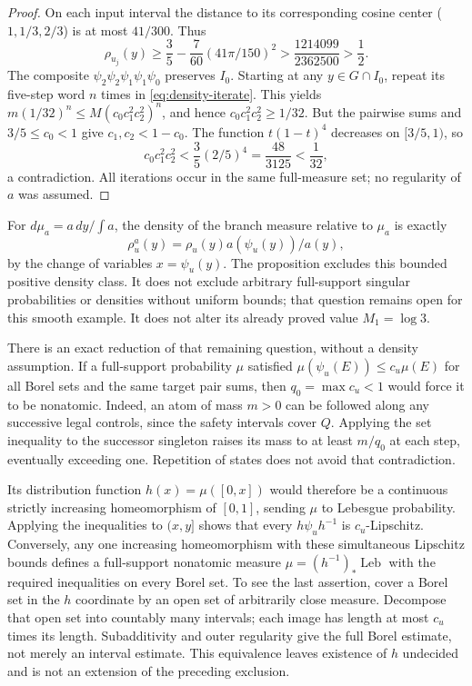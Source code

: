 \documentclass[11pt,reqno]{amsart}
\numberwithin{equation}{section}
\theoremstyle{definition}
\newcommand{\Leb}{\operatorname{Leb}}
\begin{document}
\begin{proof}
On each input interval the distance to its corresponding cosine
center ($1,1/3,2/3$) is at most $41/300$. Thus
\[
 \rho_{u_j}(y)\ge\frac35-\frac7{60}(41\pi/150)^2
 >\frac{1214099}{2362500}>\frac12.
\]
The composite $\psi_2\psi_2\psi_1\psi_1\psi_0$ preserves
$I_0$. Starting at any $y\in G\cap I_0$, repeat its five-step
word $n$ times in \eqref{eq:density-iterate}. This yields
$m(1/32)^n\le M(c_0c_1^2c_2^2)^n$, and hence
$c_0c_1^2c_2^2\ge1/32$. But the pairwise sums and
$3/5\le c_0<1$ give $c_1,c_2<1-c_0$. The function
$t(1-t)^4$ decreases on $[3/5,1)$, so
\[
 c_0c_1^2c_2^2<\frac35(2/5)^4=\frac{48}{3125}<\frac1{32},
\]
a contradiction. All iterations occur in the same full-measure
set; no regularity of $a$ was assumed.
\end{proof}

For $d\mu_a=a\,dy/\int a$, the density of the branch measure
relative to $\mu_a$ is exactly
\[
 \rho_u^a(y)=\rho_u(y)a(\psi_u(y))/a(y),
\]
by the change of variables
$x=\psi_u(y)$. The proposition excludes this bounded positive
density class. It does not exclude arbitrary full-support singular
probabilities or densities without uniform bounds; that question
remains open for this smooth example. It does not alter its already
proved value $M_1=\log3$.

There is an exact reduction of that remaining question, without a
density assumption. If a full-support probability $\mu$ satisfied
$\mu(\psi_u(E))\le c_u\mu(E)$ for all Borel sets and the
same target pair sums, then $q_0=\max c_u<1$ would force it to
be nonatomic. Indeed, an atom of mass $m>0$ can be followed along
any successive legal controls, since the safety intervals cover
$Q$. Applying the set inequality to the successor singleton raises
its mass to at least $m/q_0$ at each step, eventually exceeding
one. Repetition of states does not avoid that contradiction.

Its distribution function $h(x)=\mu([0,x])$ would therefore be a
continuous strictly increasing homeomorphism of $[0,1]$, sending
$\mu$ to Lebesgue probability. Applying the inequalities to
$(x,y]$ shows that every $h\psi_uh^{-1}$ is $c_u$-Lipschitz.
Conversely, any one increasing homeomorphism with these simultaneous
Lipschitz bounds defines a full-support nonatomic measure
$\mu=(h^{-1})_*\Leb$ with the required inequalities on every
Borel set. To see the last assertion, cover a Borel set in the
$h$ coordinate by an open set of arbitrarily close measure.
Decompose that open set into countably many intervals; each image
has length at most $c_u$ times its length. Subadditivity and
outer regularity give the full Borel estimate, not merely an
interval estimate. This equivalence leaves existence of $h$
undecided and is not an extension of the preceding exclusion.
\end{document}
